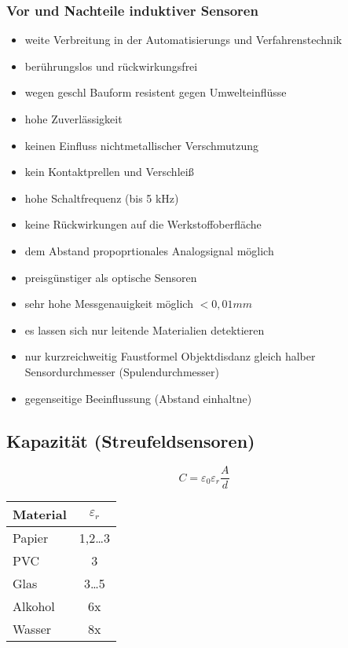 \documentclass[a4paper]{scrartcl}
\begin{document}
\subsubsection{Vor und Nachteile induktiver Sensoren}
\begin{itemize}
\item weite Verbreitung in der Automatisierungs und Verfahrenstechnik
\item berührungslos und rückwirkungsfrei
\item wegen geschl Bauform resistent gegen Umwelteinflüsse
\item hohe Zuverlässigkeit
\item keinen Einfluss nichtmetallischer Verschmutzung
\item kein Kontaktprellen und Verschleiß
\item hohe Schaltfrequenz (bis 5 kHz)
\item keine Rückwirkungen auf die Werkstoffoberfläche
\item dem Abstand propoprtionales Analogsignal möglich
\item preisgünstiger als optische Sensoren
\item sehr hohe Messgenauigkeit möglich $< 0,01 mm$
\item es lassen sich nur leitende Materialien detektieren
\item nur kurzreichweitig Faustformel Objektdisdanz gleich halber Sensordurchmesser (Spulendurchmesser)
\item gegenseitige Beeinflussung (Abstand einhaltne)
\end{itemize}

\subsection{Kapazität (Streufeldsensoren)}
\[ C = \varepsilon_0 \varepsilon_r \frac{A}{d} \]
\begin{tabular}{l|c}
Material & $\varepsilon_r$ \\ \hline
Papier & 1,2\dots3\\
PVC & 3\\
Glas & 3\dots 5 \\
Alkohol & 6x \\
Wasser & 8x \\
\end{tabular}
\end{document}
